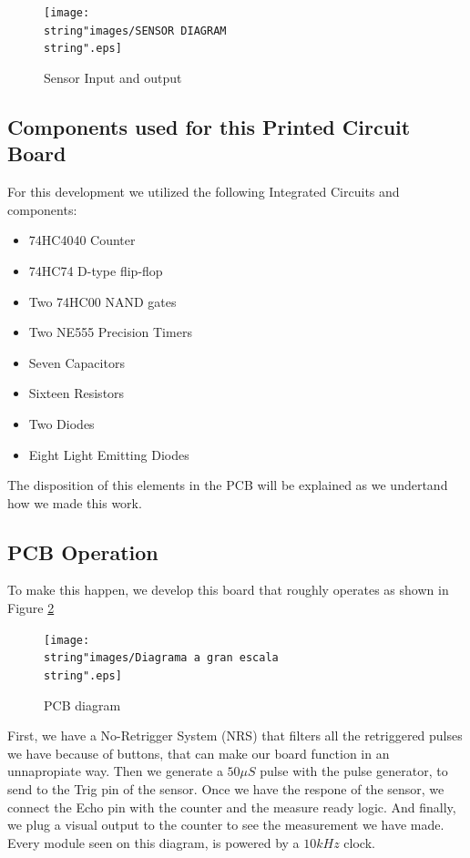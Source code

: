 \begin{figure}[H]
\begin{centering}
\texttt{[image: \\string"images/SENSOR DIAGRAM\\string".eps]}
\par\end{centering}
\caption{Sensor Input and output}
\label{8_2}

\end{figure}

\subsection{Components used for this Printed Circuit Board}

For this development we utilized the following Integrated Circuits
and components:
\begin{itemize}
\item 74HC4040 Counter 
\item 74HC74 D-type flip-flop
\item Two 74HC00 NAND gates
\item Two NE555 Precision Timers
\item Seven Capacitors
\item Sixteen Resistors
\item Two Diodes
\item Eight Light Emitting Diodes
\end{itemize}
The disposition of this elements in the PCB will be explained as we
undertand how we made this work.

\subsection{PCB Operation}

To make this happen, we develop this board that roughly operates as
shown in Figure \ref{8_3}

\begin{figure}[H]
\begin{centering}
\texttt{[image: \\string"images/Diagrama a gran escala\\string".eps]}
\par\end{centering}
\caption{PCB diagram}

\label{8_3}
\end{figure}

First, we have a No-Retrigger System (NRS) that filters all the retriggered
pulses we have because of buttons, that can make our board function
in an unnapropiate way. Then we generate a $50\mu S$ pulse with the
pulse generator, to send to the Trig pin of the sensor. Once we have
the respone of the sensor, we connect the Echo pin with the counter
and the measure ready logic. And finally, we plug a visual output
to the counter to see the measurement we have made. Every module seen
on this diagram, is powered by a $10kHz$ clock.

